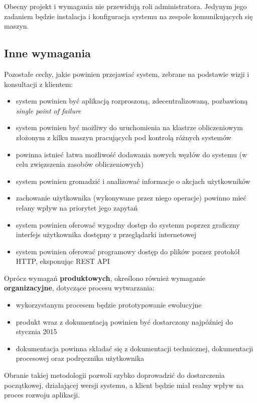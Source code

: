 Obecny projekt i wymagania nie przewidują roli administratora. Jedynym jego zadaniem będzie instalacja i konfiguracja systemu na zespole komunikujących się maszyn.

\subsection{Inne wymagania}
Pozostałe cechy, jakie powinien przejawiać system, zebrane na podstawie wizji i konsultacji z klientem:
\begin{itemize}
	\item system powinien być aplikacją rozproszoną, zdecentralizowaną, pozbawioną \textit{single point of failure}
	\item system powinien być możliwy do uruchomienia na klastrze obliczeniowym złożonym z kilku maszyn pracujących pod kontrolą różnych systemów
	\item powinna istnieć łatwa możliwość dodawania nowych węzłów do systemu (w celu zwięzszenia zasobów obliczeniowych)
	\item system powinien gromadzić i analizować informacje o akcjach użytkowników
	\item zachowanie użytkownika (wykonywane przez niego operacje) powinno mieć relany wpływ na priorytet jego zapytań
	\item system powinien oferować wygodny dostęp do systemu poprzez graficzny interfejs użytkownika dostępny z przeglądarki internetowej
	\item system powinien oferować programowy dostęp do plików porzez protokół HTTP, eksponując REST API
\end{itemize}

Oprócz wymagań \textbf{produktowych}, określono również wymaganie \textbf{organizacyjne}, dotyczące procesu wytwarzania:
\begin{itemize}
	\item wykorzystanym procesem będzie prototypowanie ewolucyjne
	\item produkt wraz z dokumentacją powinien być dostarczony najpóźniej do stycznia 2015
	\item dokumentacja powinna składać się z dokumentacji technicznej, dokumentacji procesowej oraz podręcznika użytkownika
\end{itemize}

Obranie takiej metodologii pozwoli szybko doprowadzić do dostarczenia początkowej, działającej wersji systemu, a klient będzie miał realny wpływ na proces rozwoju aplikacji.